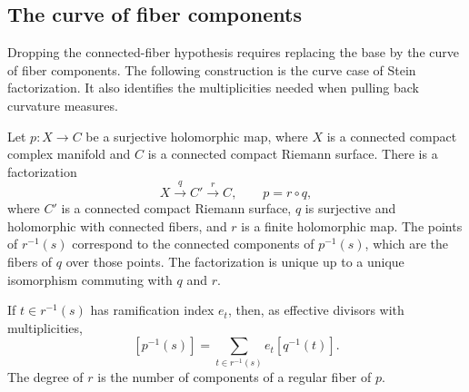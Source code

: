 \subsection{The curve of fiber components}
\label{subsec:curve-component-factor}

Dropping the connected-fiber hypothesis requires replacing the
base by the curve of fiber components. The following construction
is the curve case of Stein factorization. It also identifies the
multiplicities needed when pulling back curvature measures.

\begin{proposition}\label{curve-map:component-factor}
Let $p\colon X\to C$ be a surjective holomorphic map, where $X$ is a
connected compact complex manifold and
$C$ is a connected compact Riemann surface. There is a
factorization
\[
 X\xrightarrow{q}C'\xrightarrow{r}C,\qquad p=r\circ q,
\]
where $C'$ is a connected compact Riemann surface, $q$ is
surjective and holomorphic with connected fibers, and $r$ is a
finite holomorphic map. The points of $r^{-1}(s)$ correspond to
the connected components of $p^{-1}(s)$, which are the fibers
of $q$ over those points. The factorization is unique up to a
unique isomorphism commuting with $q$ and $r$.

If $t\in r^{-1}(s)$ has ramification index $e_t$, then, as
effective divisors with multiplicities,
\[
 [p^{-1}(s)]=\sum_{t\in r^{-1}(s)}e_t[q^{-1}(t)].
\]
The degree of $r$ is the number of components of a regular
fiber of $p$.
\end{proposition}
